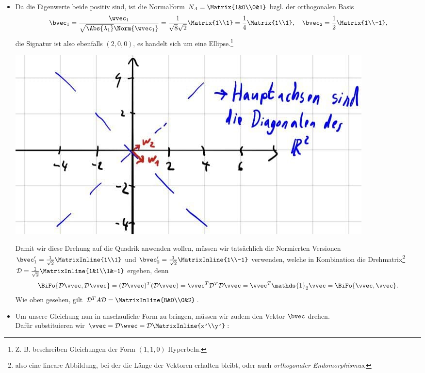 \begin{Beispiel}
\begin{itemize}
\begin{equation*}
    \end{equation*}
    \item Da die Eigenwerte beide positiv sind, ist die Normalform $N_A=\Matrix{1&0\\0&1}$ bzgl. der orthogonalen Basis
\begin{equation*}
    \bvec_1=\frac{\wvec_1}{\sqrt{\Abs{\lambda_1}}\Norm{\wvec_1}}=\frac{1}{\sqrt{8}\sqrt{2}}\Matrix{1\\1}=\frac{1}{4}\Matrix{1\\1},\quad \bvec_2=\frac{1}{2}\Matrix{1\\-1},
\end{equation*}
die Signatur ist also ebenfalls $(2,0,0)$, es handelt sich um eine Ellipse.\footnote{Z. B. beschreiben Gleichungen der Form $(1,1,0)$ Hyperbeln.}
\begin{center}
    \includegraphics[width=.35\textwidth]{Dateien/05/05DrehungHauptachsen.jpg}
\end{center}
    Damit wir diese Drehung auf die Quadrik anwenden wollen, müssen wir tatsächlich die Normierten Versionen $\bvec_1'=\frac{1}{\sqrt{2}}\MatrixInline{1\\1}$ und $\bvec_2'=\frac{1}{\sqrt{2}}\MatrixInline{1\\-1}$ verwenden, welche in Kombination die Drehmatrix\footnote{also eine lineare Abbildung, bei der die Länge der Vektoren erhalten bleibt, oder auch \textit{orthogonaler Endomorphismus}.} $\mathcal{D}=\frac{1}{\sqrt{2}}\MatrixInline{1&1\\1&-1}$ ergeben, denn
    \begin{equation*}
        \BiFo{\mathcal{D}\vvec,\mathcal{D}\vvec}=(\mathcal{D}\vvec)^T(\mathcal{D}\vvec)=\vvec^T\mathcal{D}^T\mathcal{D} \vvec=\vvec^T\mathds{1}_2\vvec=\BiFo{\vvec,\vvec}.
    \end{equation*}
    Wie oben gesehen, gilt $\mathcal{D}^TA\mathcal{D}=\MatrixInline{8&0\\0&2}$.
    \item Um unsere Gleichung nun in anschauliche Form zu bringen, müssen wir zudem den Vektor $\bvec$ drehen.\\
    Dafür substituieren wir $\vvec=\mathcal{D}\wvec=\mathcal{D}\MatrixInline{x'\\y'}$:

\end{itemize}
\end{Beispiel}
